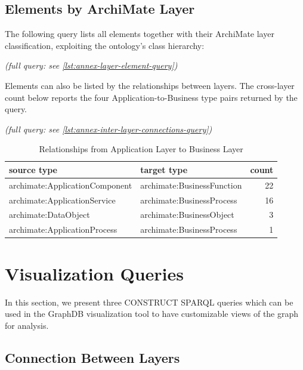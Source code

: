 \subsection{Elements by ArchiMate Layer}
\label{subsec:layer-listings}

The following query lists all elements together with their ArchiMate layer classification, exploiting the ontology's class hierarchy:

\textit{(full query: see \autoref{lst:annex-layer-element-query})}

Elements can also be listed by the relationships between layers. The cross-layer count below reports the four Application-to-Business type pairs returned by the query.

\textit{(full query: see \autoref{lst:annex-inter-layer-connections-query})}

\begin{table}[H]
\centering
\caption{Relationships from Application Layer to Business Layer}
\label{tab:cross-layer-results}
\small
\begin{tabularx}{\linewidth}{X X r}
\toprule
\textbf{source type} & \textbf{target type} & \textbf{count} \\
\midrule
archimate:ApplicationComponent & archimate:BusinessFunction & 22 \\
archimate:ApplicationService & archimate:BusinessProcess & 16 \\
archimate:DataObject & archimate:BusinessObject & 3 \\
archimate:ApplicationProcess & archimate:BusinessProcess & 1 \\
\bottomrule
\end{tabularx}
\end{table}

\section{Visualization Queries}
\label{sec:visualization-queries}

In this section, we present three CONSTRUCT SPARQL queries which can be used in the GraphDB visualization tool to have customizable views of the graph for analysis.

\subsection{Connection Between Layers}
\label{subsec:layers-connections}

